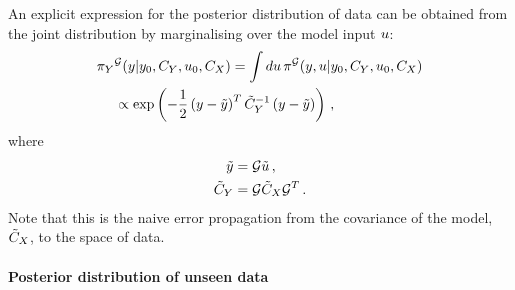An explicit expression for the posterior distribution of data can be obtained
from the joint distribution by marginalising over the model input $u$:
\begin{align}
  \label{eq:PosteriorDataSpace}
  \pi_{Y}&^{\mathcal{G}}(y|y_0,C_{Y},u_0,C_X)
  = \int du\, 
  \pi^{\mathcal{G}}(y,u|y_0,C_{Y},u_0,C_X) \nonumber\\
  &\propto \exp\left(
    -\frac12 \left(y - \tilde{y}\right)^T \tilde{C}_Y^{-1}
    \left(y - \tilde{y}\right)
  \right)\, ,
\end{align}
where
\begin{align}
  \label{eq:PosteriorDataParamsMean}
  \tilde{y} &= \mathcal{G} \tilde{u}\, , \\
  \label{eq:PosteriorDataParamsCov}
  \tilde{C}_Y &= \mathcal{G} \tilde{C}_X \mathcal{G}^T\, .
\end{align}
Note that this is the naive error propagation from the covariance of the model,
$\tilde{C}_X$, to the space of data. 

\paragraph{Posterior distribution of unseen data}

